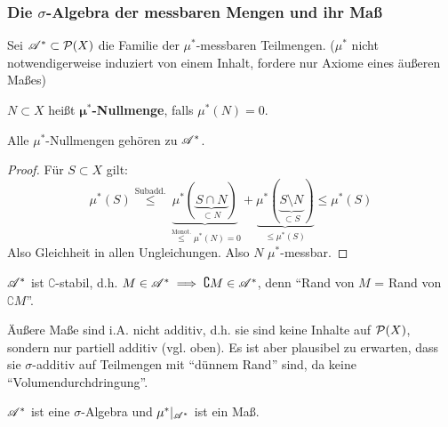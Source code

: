 \subsubsection{Die $\sigma$-Algebra der messbaren Mengen und ihr Maß}
Sei $\AA^*\subset \PP(X)$ die Familie der $\mu^*$-messbaren Teilmengen. ($\mu^*$ nicht notwendigerweise induziert von einem Inhalt, fordere nur Axiome eines äußeren Maßes)

\begin{definition}
\begin{mdframed}
$N \subset X$ heißt \textbf{$\boldsymbol\mu^{\boldsymbol*}$-Nullmenge}, falls $\mu^*(N)=0$.
\end{mdframed}
\end{definition}

\begin{lemma}
\begin{mdframed}
Alle $\mu^*$-Nullmengen gehören zu $\AA^*$.
\end{mdframed}
\begin{proof}
Für $S\subset X$ gilt:
$$
\mu^*(S) \overset{\text{Subadd.}}\leq \underbrace{\mu^*(\underbrace{S\cap N}_{\subset N})}_{\overset{\text{Monot.}}\leq \mu^*(N)=0}+\underbrace{\mu^*({\underbrace{S\setminus N}_{\subset S}})}_{\leq \mu^*(S)} \leq \mu^*(S)
$$
Also Gleichheit in allen Ungleichungen. Also $N$ $\mu^*$-messbar.
\end{proof}
\end{lemma}

\begin{beobachtung}
$\AA^*$ ist $\complement$-stabil, d.h. $M \in \AA^* \implies \complement M \in \AA^*$, denn ``Rand von $M$ = Rand von $\complement M$''.
\end{beobachtung}

Äußere Maße sind i.A. nicht additiv, d.h. sie sind keine Inhalte auf $\PP(X)$, sondern nur partiell additiv (vgl. oben). Es ist aber plausibel zu erwarten, dass sie $\sigma$-additiv auf Teilmengen mit ``dünnem Rand'' sind, da keine ``Volumendurchdringung''.

\begin{satz}
\begin{mdframed}
$\AA^*$ ist eine $\sigma$-Algebra und $\mu^*|_{\AA^*}$ ist ein Maß.
\end{mdframed}
\end{satz}

